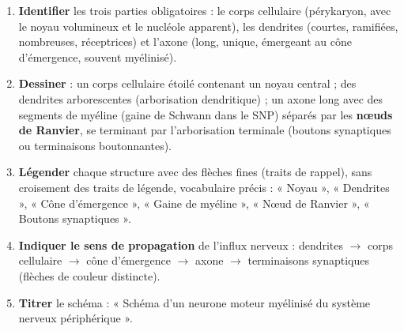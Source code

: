 \documentclass[11pt]{article}
\newcommand{\cle}[1]{{\popxbold\color{popdark}#1}}
\begin{document}
\begin{methode}
\begin{enumerate}
\item \textbf{Identifier} les trois parties obligatoires : le \cle{corps cellulaire} (pérykaryon, avec le noyau volumineux et le nucléole apparent), les \cle{dendrites} (courtes, ramifiées, nombreuses, réceptrices) et l'\cle{axone} (long, unique, émergeant au cône d'émergence, souvent myélinisé).
\item \textbf{Dessiner} : un corps cellulaire étoilé contenant un noyau central ; des dendrites arborescentes (arborisation dendritique) ; un axone long avec des segments de myéline (gaine de Schwann dans le SNP) séparés par les \textbf{nœuds de Ranvier}, se terminant par l'arborisation terminale (boutons synaptiques ou terminaisons boutonnantes).
\item \textbf{Légender} chaque structure avec des flèches fines (traits de rappel), sans croisement des traits de légende, vocabulaire précis : « Noyau », « Dendrites », « Cône d'émergence », « Gaine de myéline », « Nœud de Ranvier », « Boutons synaptiques ».
\item \textbf{Indiquer le sens de propagation} de l'influx nerveux : dendrites $\rightarrow$ corps cellulaire $\rightarrow$ cône d'émergence $\rightarrow$ axone $\rightarrow$ terminaisons synaptiques (flèches de couleur distincte).
\item \textbf{Titrer} le schéma : « Schéma d'un neurone moteur myélinisé du système nerveux périphérique ».
\end{enumerate}
\end{methode}
\end{document}
